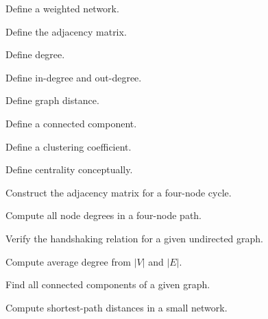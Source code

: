 \begin{exercise}[1]
Define a weighted network.
\end{exercise}

\begin{exercise}[1]
Define the adjacency matrix.
\end{exercise}

\begin{exercise}[1]
Define degree.
\end{exercise}

\begin{exercise}[1]
Define in-degree and out-degree.
\end{exercise}

\begin{exercise}[1]
Define graph distance.
\end{exercise}

\begin{exercise}[1]
Define a connected component.
\end{exercise}

\begin{exercise}[1]
Define a clustering coefficient.
\end{exercise}

\begin{exercise}[1]
Define centrality conceptually.
\end{exercise}

\begin{exercise}[2]
Construct the adjacency matrix for a four-node cycle.
\end{exercise}

\begin{exercise}[2]
Compute all node degrees in a four-node path.
\end{exercise}

\begin{exercise}[2]
Verify the handshaking relation for a given undirected graph.
\end{exercise}

\begin{exercise}[2]
Compute average degree from \(|V|\) and \(|E|\).
\end{exercise}

\begin{exercise}[2]
Find all connected components of a given graph.
\end{exercise}

\begin{exercise}[2]
Compute shortest-path distances in a small network.
\end{exercise}


